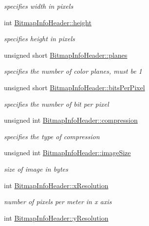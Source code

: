 \begin{DoxyCompactItemize}
\begin{DoxyCompactList}\small\item\em specifies width in pixels \end{DoxyCompactList}\item 
int \mbox{\hyperlink{group__bitmap_gaaa1d31efc13210020a38d435e4961df9}{Bitmap\+Info\+Header\+::height}}
\begin{DoxyCompactList}\small\item\em specifies height in pixels \end{DoxyCompactList}\item 
unsigned short \mbox{\hyperlink{group__bitmap_ga9925e97e8bbc6b797afe2d22fbab45d6}{Bitmap\+Info\+Header\+::planes}}
\begin{DoxyCompactList}\small\item\em specifies the number of color planes, must be 1 \end{DoxyCompactList}\item 
unsigned short \mbox{\hyperlink{group__bitmap_ga2a1eb136325c8cb16aeeb7108703702f}{Bitmap\+Info\+Header\+::bits\+Per\+Pixel}}
\begin{DoxyCompactList}\small\item\em specifies the number of bit per pixel \end{DoxyCompactList}\item 
unsigned int \mbox{\hyperlink{group__bitmap_ga87fb38b0fe68db4bed899b9733d1b7e9}{Bitmap\+Info\+Header\+::compression}}
\begin{DoxyCompactList}\small\item\em specifies the type of compression \end{DoxyCompactList}\item 
unsigned int \mbox{\hyperlink{group__bitmap_ga79bc984a7fd1c0f00ede6aa09143939f}{Bitmap\+Info\+Header\+::image\+Size}}
\begin{DoxyCompactList}\small\item\em size of image in bytes \end{DoxyCompactList}\item 
int \mbox{\hyperlink{group__bitmap_ga391cf1da75d16aee3b6539ccf5b29300}{Bitmap\+Info\+Header\+::x\+Resolution}}
\begin{DoxyCompactList}\small\item\em number of pixels per meter in x axis \end{DoxyCompactList}\item 
int \mbox{\hyperlink{group__bitmap_gaf2fadf9c216cc9f3ce401096e35be1b7}{Bitmap\+Info\+Header\+::y\+Resolution}}

\end{DoxyCompactItemize}

